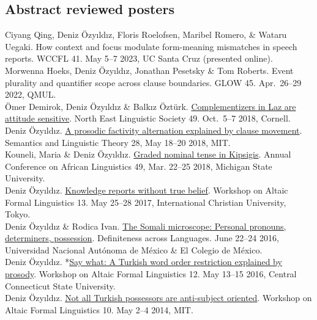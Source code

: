 \documentclass[11pt, a4paper]{article} %
\newcommand{\years}[1]{\marginnote{\scriptsize #1}} %
\newcommand{\me}{Deniz \"Ozy\i{}ld\i{}z}
\begin{document}
\subsection*{Abstract reviewed posters} 
\years{2023} Ciyang Qing, \me, Floris Roelofsen, Maribel Romero, \& Wataru
Uegaki. How context and focus modulate form-meaning mismatches in speech
reports. WCCFL 41. May 5--7 2023, UC Santa Cruz (presented online). \\[.25em]
\years{2022} Morwenna Hoeks, Deniz \"Ozy\i{}ld\i{}z, Jonathan Pesetsky \& Tom Roberts. Event plurality and quantifier scope across clause boundaries. GLOW 45. Apr.\ 26--29 2022, QMUL.\\[.25em]
\years{2018} \"Omer Demirok, Deniz \"Ozy\i{}ld\i{}z \& Balk\i{}z \"Ozt\"urk. \href{http://deniz.fr/pdfs/2018-nels-poster.pdf}{Complementizers in Laz are attitude sensitive}. North East Linguistic Society 49. Oct.\ 5--7 2018, Cornell.\\[.25em]
\me. \href{http://deniz.fr/pdfs/2018-salt-poster.pdf}{A prosodic factivity alternation explained by clause movement}. Semantics and Linguistic Theory 28, May 18--20 2018, MIT.\\[.25em]
Kouneli, Maria \& Deniz \"Ozy\i{}ld\i{}z. \href{http://deniz.fr/pdfs/2018acal-gradedntkipsigis.pdf}{Graded nominal tense in Kipsigis}. Annual Conference on African Linguistics 49, Mar. 22--25 2018, Michigan State University.\\[.25em]
\years{2017} \me. \href{http://www.deniz.fr/pdfs/2017-wafl.pdf}{Knowledge reports without true belief}. Workshop on Altaic Formal Linguistics 13. May 25--28 2017, International Christian University, Tokyo. \\[.25em]
\years{2016} \me{} \&  Rodica Ivan.
\href{http://www.deniz.fr/pdfs/2016-dal-poster.pdf}{The Somali microscope:
Personal pronouns, determiners, possession}. Definiteness across Languages. June
22--24 2016, Universidad Nacional Aut\'onoma de M\'exico \& El Colegio de
M\'exico.\\[.25em]
\me. *\href{http://www.deniz.fr/pdfs/2016-wafl-poster.pdf}{Say what: A Turkish word order restriction explained by prosody}. Workshop on Altaic Formal Linguistics 12. May 13--15 2016, Central Connecticut State University.\\[.25em]
\years{2014} \me. \href{http://deniz.fr/pdfs/possessives_poster.pdf}{Not all Turkish possessors are anti-subject oriented}. Workshop on Altaic Formal Linguistics 10. May 2--4 2014, MIT.
\end{document}
